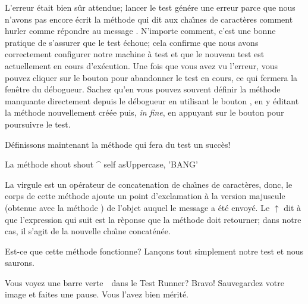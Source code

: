 \documentclass[a4paper,10pt,twoside]{book}
\begin{document}
L'erreur \'etait bien s\^ur attendue; lancer le test g\'en\'ere une
erreur parce que nous n'avons pas encore \'ecrit la m\'ethode qui dit
aux cha\^{\i}nes de caract\`eres comment hurler 
\cad comme r\'epondre au message .
N'importe comment, c'est une bonne pratique de s'assurer que le test
\'echoue; cela confirme que nous avons correctement
configurer notre machine \`a test %
et que le nouveau test est actuellement en cours d'ex\'ecution.
Une fois que vous avez vu l'erreur, vous pouvez cliquer sur le bouton
 pour abandonner le test en cours, ce qui fermera la
fen\^etre du d\'ebogueur.
Sachez qu'en \st vous pouvez souvent d\'efinir la m\'ethode manquante
directement depuis le d\'ebogueur 
en utilisant le bouton , en y \'editant la m\'ethode
nouvellement cr\'e\'ee puis, \emph{in fine}, en appuyant sur le bouton
 pour poursuivre le test.

D\'efinissons maintenant la m\'ethode qui fera du test un succ\`es!

\begin{method}[shout]{La m\'ethode shout}
shout
	^ self asUppercase, 'BANG'
\end{method}

La virgule est un op\'erateur de concatenation de cha\^{\i}nes de
caract\`eres, donc, le corps de cette m\'ethode ajoute un point
d'exclamation \`a la version majuscule
(obtenue avec la m\'ethode )
de l'objet  auquel le message  a \'et\'e
envoy\'e.
Le $\uparrow$ dit \`a \sq que l'expression qui suit est la r\`eponse
que la m\'ethode doit retourner; dans notre cas, il s'agit de la
nouvelle cha\^{\i}ne concat\'en\'ee.

Est-ce que cette m\'ethode fonctionne? Lan\c{c}ons tout simplement
notre test et nous saurons.

Vous voyez une barre verte~\footnotemark\ dans le Test Runner? Bravo!
Sauvegardez votre image et faites une pause. 
Vous l'avez bien m\'erit\'e. 
\end{document}
